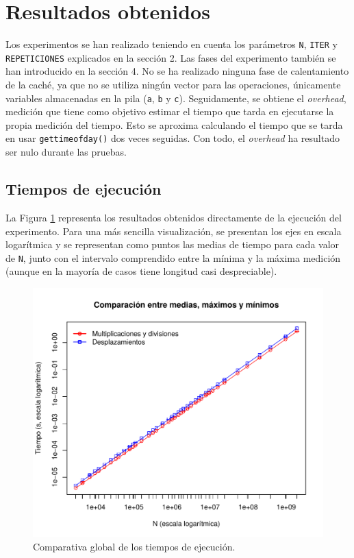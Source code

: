 \documentclass[11pt,a4paper,twoside]{article}
\theoremstyle{definition}
\begin{document}
	
	\section{Resultados obtenidos}
	
	Los experimentos se han realizado teniendo en cuenta los parámetros \texttt{N}, \texttt{ITER} y \texttt{REPETICIONES} explicados en la sección 2. Las fases del experimento también se han introducido en la sección 4. No se ha realizado ninguna fase de calentamiento de la caché, ya que no se utiliza ningún vector para las operaciones, únicamente variables almacenadas en la pila (\texttt{a}, \texttt{b} y \texttt{c}). Seguidamente, se obtiene el \textit{overhead}, medición que tiene como objetivo estimar el tiempo que tarda en ejecutarse la propia medición del tiempo. Esto se aproxima calculando el tiempo que se tarda en usar \texttt{gettimeofday()} dos veces seguidas. Con todo, el \textit{overhead} ha resultado ser nulo durante las pruebas.
	
	\subsection{Tiempos de ejecución}
	
	La Figura \ref{graf:tiempos} representa los resultados obtenidos directamente de la ejecución del experimento. Para una más sencilla visualización, se presentan los ejes en escala logarítmica y se representan como puntos las medias de tiempo para cada valor de \texttt{N}, junto con el intervalo comprendido entre la mínima y la máxima medición (aunque en la mayoría de casos tiene longitud casi despreciable).
	
	\begin{figure} [H] \centering
		\includegraphics[width=.8\textwidth]{../graficas/NOCHE_tiempos.pdf}
		\caption{Comparativa global de los tiempos de ejecución.}
		\label{graf:tiempos}
	\end{figure}
\end{document}

